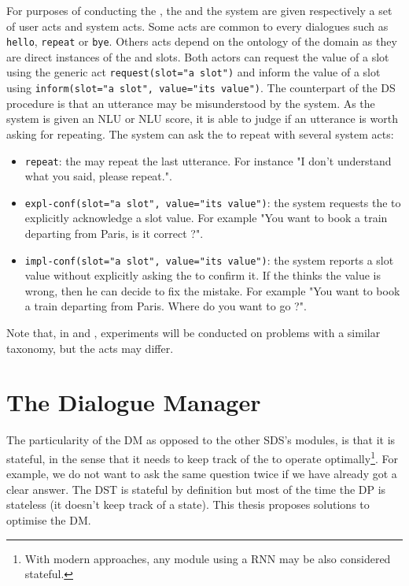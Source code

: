 For purposes of conducting the , the  and the system are given respectively a set of user acts and system acts. Some acts are common to every dialogues such as \texttt{hello}, \texttt{repeat} or \texttt{bye}. Others acts depend on the ontology of the domain as they are direct instances of the \requestable and \informable slots. Both actors can request the value of a slot using the generic act \texttt{request(slot="a slot")} and inform the value of a slot using \texttt{inform(slot="a slot", value="its value")}. The counterpart of the \gls{DS}  procedure is that an utterance may be misunderstood by the system. As the system is given an \gls{NLU} or \gls{NLU} score, it is able to judge if an utterance is worth asking for repeating. The system can ask the  to repeat with several system acts:

\begin{itemize}
    \item \texttt{repeat}: the  may repeat the last utterance. For instance "I don't understand what you said, please repeat.".
    \item \texttt{expl-conf(slot="a slot", value="its value")}: the system requests the  to explicitly acknowledge a slot value. For example "You want to book a train departing from Paris, is it correct ?".
    \item \texttt{impl-conf(slot="a slot", value="its value")}: the system reports a slot value without explicitly asking the  to confirm it. If the  thinks the value is wrong, then he can decide to fix the mistake. For example "You want to book a train departing from Paris. Where do you want to go ?".
\end{itemize}

Note that, in  and , experiments will be conducted on  problems with a similar taxonomy, but the acts may differ.


\section{The Dialogue Manager}
\label{sec:dm}

The particularity of the \gls{DM} as opposed to the other \gls{SDS}'s modules, is that it is stateful, in the sense that it needs to keep track of the  to operate optimally\footnote{With modern approaches, any module using a \gls{RNN} may be also considered stateful.}. For example, we do not want to ask the same question twice if we have already got a clear answer. The \gls{DST} is stateful by definition but most of the time the \gls{DP} is stateless (it doesn't keep track of a state). This thesis proposes solutions to optimise the \gls{DM}.

